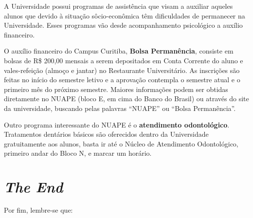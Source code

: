 \documentclass[a4paper,12pt,openany]{article}
\begin{document}
A Universidade possui programas de assistência que visam a auxiliar aqueles alunos que devido à situação sôcio-econômica têm dificuldades de permanecer na Universidade.
Esses programas vão desde acompanhamento psicológico a auxílio financeiro.

O auxílio financeiro do Campus Curitiba, \textbf{Bolsa Permanência}, consiste em bolsas de R\$ 200,00 mensais a serem depositados em Conta Corrente do aluno e vales-refeição (almoço e jantar) no Restaurante Universitário. As inscrições são feitas no início do semestre letivo e a aprovação contempla o semestre atual e o primeiro mês do próximo semestre. Maiores informações podem ser obtidas diretamente no NUAPE (bloco E, em cima do Banco do Brasil) ou através do site da universidade, buscando pelas palavras “NUAPE” ou “Bolsa Permanência”.

Outro programa interessante do NUAPE é o \textbf{atendimento odontológico}. Tratamentos dentários básicos são oferecidos dentro da Universidade gratuitamente aos alunos, basta ir até o Núcleo de Atendimento Odontológico, primeiro andar do Bloco N, e marcar um horário.





\newpage
\section{\textit{The End}}

Por fim, lembre-se que:
\end{document}
